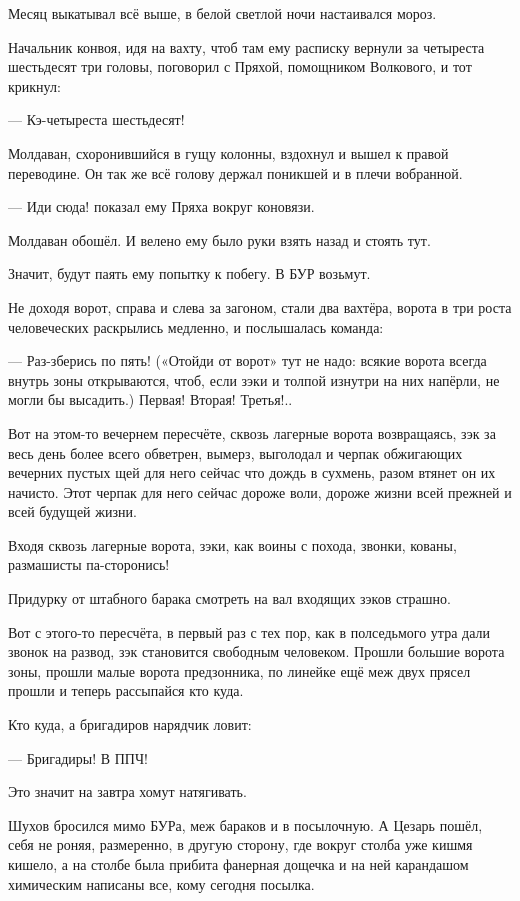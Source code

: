 Месяц выкатывал всё выше, в белой светлой ночи настаивался мороз.

Начальник конвоя, идя на вахту, чтоб там ему расписку вернули за четыреста шестьдесят три
головы, поговорил с Пряхой, помощником Волкового, и тот крикнул:

--- Кэ-четыреста шестьдесят!

Молдаван, схоронившийся в гущу колонны, вздохнул и вышел к правой переводине. Он так же всё
голову держал поникшей и в плечи вобранной.

--- Иди сюда! \dash показал ему Пряха вокруг коновязи.

Молдаван обошёл. И велено ему было руки взять назад и стоять тут.

Значит, будут паять ему попытку к побегу. В БУР возьмут.

Не доходя ворот, справа и слева за загоном, стали два вахтёра, ворота в три роста
человеческих раскрылись медленно, и послышалась команда:

--- Раз-зберись по пять! \dash («Отойди от ворот» тут не надо: всякие ворота всегда внутрь зоны
открываются, чтоб, если зэки и толпой изнутри на них напёрли, не могли бы высадить.) \Dash Первая!
Вторая! Третья!..

Вот на этом-то вечернем пересчёте, сквозь лагерные ворота возвращаясь, зэк за весь день
более всего обветрен, вымерз, выголодал \dash и черпак обжигающих вечерних пустых щей для него
сейчас что дождь в сухмень, \dash разом втянет он их начисто. Этот черпак для него сейчас дороже
воли, дороже жизни всей прежней и всей будущей жизни.

Входя сквозь лагерные ворота, зэки, как воины с похода, \dash звонки, кованы, размашисты \dash
па-сторонись!

Придурку от штабного барака смотреть на вал входящих зэков \dash страшно.

Вот с этого-то пересчёта, в первый раз с тех пор, как в полседьмого утра дали звонок на развод,
зэк становится свободным человеком. Прошли большие ворота зоны, прошли малые ворота
предзонника, по линейке ещё меж двух прясел прошли \dash и теперь рассыпайся кто куда.

Кто куда, а бригадиров нарядчик ловит:

--- Бригадиры! В ППЧ!

Это значит \dash на завтра хомут натягивать.

Шухов бросился мимо БУРа, меж бараков \dash и в посылочную. А Цезарь пошёл, себя не роняя,
размеренно, в другую сторону, где вокруг столба уже кишмя кишело, а на столбе была прибита
фанерная дощечка и на ней карандашом химическим написаны все, кому сегодня посылка.

